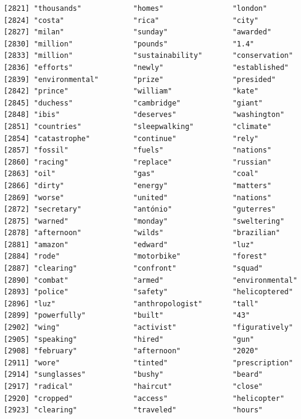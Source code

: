\documentclass[
  letterpaper,
  DIV=11,
  numbers=noendperiod]{scrartcl}
\begin{document}
\begin{verbatim}
[2821] "thousands"            "homes"                "london"              
[2824] "costa"                "rica"                 "city"                
[2827] "milan"                "sunday"               "awarded"             
[2830] "million"              "pounds"               "1.4"                 
[2833] "million"              "sustainability"       "conservation"        
[2836] "efforts"              "newly"                "established"         
[2839] "environmental"        "prize"                "presided"            
[2842] "prince"               "william"              "kate"                
[2845] "duchess"              "cambridge"            "giant"               
[2848] "ibis"                 "deserves"             "washington"          
[2851] "countries"            "sleepwalking"         "climate"             
[2854] "catastrophe"          "continue"             "rely"                
[2857] "fossil"               "fuels"                "nations"             
[2860] "racing"               "replace"              "russian"             
[2863] "oil"                  "gas"                  "coal"                
[2866] "dirty"                "energy"               "matters"             
[2869] "worse"                "united"               "nations"             
[2872] "secretary"            "antónio"              "guterres"            
[2875] "warned"               "monday"               "sweltering"          
[2878] "afternoon"            "wilds"                "brazilian"           
[2881] "amazon"               "edward"               "luz"                 
[2884] "rode"                 "motorbike"            "forest"              
[2887] "clearing"             "confront"             "squad"               
[2890] "combat"               "armed"                "environmental"       
[2893] "police"               "safety"               "helicoptered"        
[2896] "luz"                  "anthropologist"       "tall"                
[2899] "powerfully"           "built"                "43"                  
[2902] "wing"                 "activist"             "figuratively"        
[2905] "speaking"             "hired"                "gun"                 
[2908] "february"             "afternoon"            "2020"                
[2911] "wore"                 "tinted"               "prescription"        
[2914] "sunglasses"           "bushy"                "beard"               
[2917] "radical"              "haircut"              "close"               
[2920] "cropped"              "access"               "helicopter"          
[2923] "clearing"             "traveled"             "hours"               

\end{verbatim}
\end{document}
